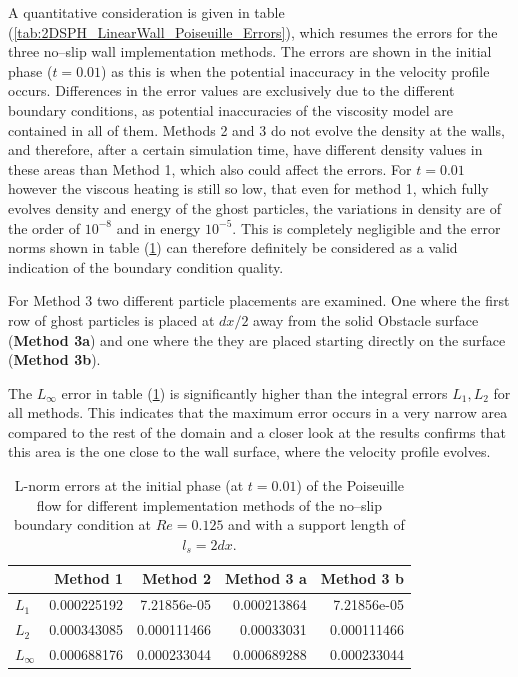 \documentclass{report}
\begin{document}
 A quantitative consideration is given in table (\ref{tab:2DSPH_LinearWall_Poiseuille_Errors}), which resumes the errors for the three no--slip wall implementation methods. The errors are shown in the initial phase ($t=0.01$) as this is when the potential inaccuracy in the velocity profile occurs. Differences in the error values are exclusively due to the different boundary conditions, as potential inaccuracies of the viscosity model are contained in all of them. Methods 2 and 3 do not evolve the density at the walls, and therefore, after a certain simulation time, have different density values in these areas than Method 1, which also could affect the errors. For $t=0.01$ however the viscous heating is still so low, that even for method 1, which fully evolves density and energy of the ghost particles, the variations in density are of the order of $10^{-8}$ and in energy $10^{-5}$. This is completely negligible and the error norms shown in table (\ref{tab:2DSPH_LinearWall_Poiseuille_Errors_t0_01}) can therefore definitely be considered as a valid indication of the boundary condition quality.



For Method 3 two different particle placements are examined. One where the first row of ghost particles is placed at $dx/2$ away from the solid Obstacle surface ({\bf Method 3a}) and one where the they are placed starting directly on the surface ({\bf Method 3b}).

The $L_\infty$ error in table (\ref{tab:2DSPH_LinearWall_Poiseuille_Errors_t0_01}) is significantly higher than the integral errors $L_1, L_2$ for all methods. This indicates that the maximum error occurs in a very narrow area compared to the rest of the domain and a closer look at the results confirms that this area is the one close to the wall surface, where the velocity profile evolves.


 
\begin{table}[h] %
\label{tab:2DSPH_LinearWall_Poiseuille_Errors_t0_01}
\centering
\begin{tabular}[c]{||l||r|r|r|r||} %
\hline
\hline
 &{\bf Method 1} & {\bf Method 2} & {\bf Method 3 a}& {\bf Method 3 b}\\
\hline
\hline
$L_1$&0.000225192 & 7.21856e-05 & 0.000213864& 7.21856e-05\\
\hline
$L_2$&0.000343085 & 0.000111466 & 0.00033031& 0.000111466 \\
\hline
$L_\infty$&0.000688176 & 0.000233044 & 0.000689288& 0.000233044\\
\hline
\hline
\end{tabular}
  
  \caption[]{L-norm errors at the initial phase (at $t=0.01$) of the Poiseuille flow 
for different implementation methods of the no--slip boundary condition at $Re=0.125$ and with a support length of $l_s=2dx$.}
\end{table}
\end{document}
